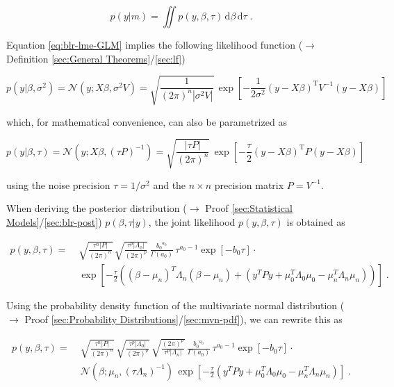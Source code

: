 \documentclass[a4paper,12pt,twoside]{book}
\begin{document}
\begin{equation} \label{eq:blr-lme-GLM-NG-ME-s2}
p(y|m) = \iint p(y,\beta,\tau) \, \mathrm{d}\beta \, \mathrm{d}\tau \; .
\end{equation}

Equation \eqref{eq:blr-lme-GLM} implies the following likelihood function ($\rightarrow$ Definition \ref{sec:General Theorems}/\ref{sec:lf})

\begin{equation} \label{eq:blr-lme-GLM-LF-class}
p(y|\beta,\sigma^2) = \mathcal{N}(y; X \beta, \sigma^2 V) = \sqrt{\frac{1}{(2 \pi)^n |\sigma^2 V|}} \, \exp\left[ -\frac{1}{2 \sigma^2} (y-X\beta)^\mathrm{T} V^{-1} (y-X\beta) \right]
\end{equation}

which, for mathematical convenience, can also be parametrized as

\begin{equation} \label{eq:blr-lme-GLM-LF-Bayes}
p(y|\beta,\tau) = \mathcal{N}(y; X \beta, (\tau P)^{-1}) = \sqrt{\frac{|\tau P|}{(2 \pi)^n}} \, \exp\left[ -\frac{\tau}{2} (y-X\beta)^\mathrm{T} P (y-X\beta) \right]
\end{equation}

using the noise precision $\tau = 1/\sigma^2$ and the $n \times n$ precision matrix $P = V^{-1}$.

\vspace{1em}
When deriving the posterior distribution ($\rightarrow$ Proof \ref{sec:Statistical Models}/\ref{sec:blr-post}) $p(\beta,\tau|y)$, the joint likelihood $p(y,\beta,\tau)$ is obtained as

\begin{equation} \label{eq:blr-lme-GLM-NG-LME-s1}
\begin{split}
p(y,\beta,\tau) = \; & \sqrt{\frac{\tau^n |P|}{(2 \pi)^n}} \, \sqrt{\frac{\tau^p |\Lambda_0|}{(2 \pi)^p}} \, \frac{ {b_0}^{a_0}}{\Gamma(a_0)} \, \tau^{a_0-1} \exp[-b_0 \tau] \cdot \\
& \exp\left[ -\frac{\tau}{2} \left( (\beta-\mu_n)^T \Lambda_n (\beta-\mu_n) + (y^T P y + \mu_0^T \Lambda_0 \mu_0 - \mu_n^T \Lambda_n \mu_n) \right) \right] \; .
\end{split}
\end{equation}

Using the probability density function of the multivariate normal distribution ($\rightarrow$ Proof \ref{sec:Probability Distributions}/\ref{sec:mvn-pdf}), we can rewrite this as

\begin{equation} \label{eq:blr-lme-GLM-NG-LME-s2}
\begin{split}
p(y,\beta,\tau) = \; & \sqrt{\frac{\tau^n |P|}{(2 \pi)^n}} \, \sqrt{\frac{\tau^p |\Lambda_0|}{(2 \pi)^p}} \, \sqrt{\frac{(2 \pi)^p}{\tau^p |\Lambda_n|}} \, \frac{ {b_0}^{a_0}}{\Gamma(a_0)} \, \tau^{a_0-1} \exp[-b_0 \tau] \cdot \\
& \mathcal{N}(\beta; \mu_n, (\tau \Lambda_n)^{-1}) \, \exp\left[ -\frac{\tau}{2} (y^T P y + \mu_0^T \Lambda_0 \mu_0 - \mu_n^T \Lambda_n \mu_n) \right] \; .
\end{split}
\end{equation}
\end{document}
